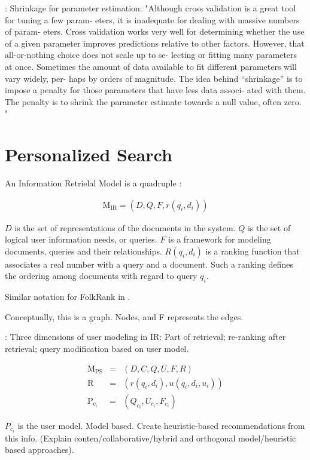 \cite[p2]{Bell2007b}: Shrinkage for parameter estimation:
"Although cross validation is a great tool for tuning a few param- eters, it is inadequate for dealing with massive numbers of param- eters. Cross validation works very well for determining whether the use of a given parameter improves predictions relative to other factors. However, that all-or-nothing choice does not scale up to se- lecting or fitting many parameters at once. Sometimes the amount of data available to fit different parameters will vary widely, per- haps by orders of magnitude. The idea behind “shrinkage” is to impose a penalty for those parameters that have less data associ- ated with them. The penalty is to shrink the parameter estimate towards a null value, often zero. "



\section{Personalized Search}

An Information Retrielal Model is a quadruple \citep[p23]{Baeza-Yates1999}:

\begin{eqnarray}
  \mathrm{M_{IR}} = (D, Q, F, r(q_i, d_i))
\end{eqnarray}

$D$ is the set of representations of the documents in the system. $Q$ is the set of logical user information needs, or queries.
$F$ is a framework for modeling documents, queries and their relationships.
$R(q_i, d_i)$ is a ranking function that associates a real number with a query and a document.
Such a ranking defines the ordering among documents with regard to query $q_i$.

Similar notation for FolkRank in \cite[p4]{Hotho}.

Conceptually, this is a graph.
Nodes, and F represents the edges.

\cite[p6]{Micarelli2007}: Three dimensions of user modeling in IR: Part of retrieval; re-ranking after
retrieval; query modification based on user model.

\begin{eqnarray}
  \mathrm{M_{PS}}  &=& (D, C, Q, U, F, R)\\
  \mathrm{R}       &=& (r(q_i, d_i), u(q_i, d_i, u_i))\\
  \mathrm{P_{c_i}} &=& (Q_{c_i}, U_{c_i}, F_{c_i})
\end{eqnarray}

$P_{c_i}$ is the user model. Model based. Create heuristic-based recommendations from this info.
(Explain conten/collaborative/hybrid and orthogonal model/heuristic based approaches).

